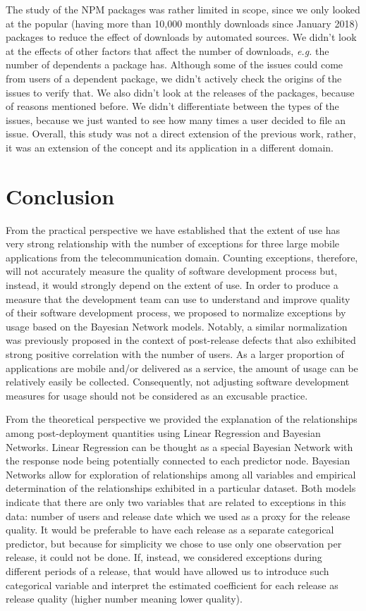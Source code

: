 \documentclass[smallextended]{svjour3}       %
\begin{document}
The study of the NPM packages was rather limited in scope, since we
only looked at the popular (having more than 10,000 monthly downloads 
since January 2018) packages to reduce the effect of downloads by 
automated sources. We didn't look at the effects of other factors 
that affect the number of downloads, \emph{e.g.} the number of 
dependents a package has. Although some of the issues could come 
from users of a dependent package, we didn't actively check the
origins of the issues to verify that. We also didn't look at the
releases of the packages, because of reasons mentioned before.
We didn't differentiate between the types of the issues, because we 
just wanted to see how many times a user decided to file an issue.
Overall, this study was not a direct extension of the previous work,
rather, it was an extension of the concept and its application in a different domain.



\section{Conclusion}\label{s:conclusion}

From the practical perspective we have established
that the extent of use has very strong relationship with the number
of exceptions for three large mobile applications from 
the telecommunication domain. Counting exceptions,
therefore, will not accurately measure the quality of software
development process but, instead, it would strongly depend on the
extent of use. In order to produce a measure that the development
team can use to understand and improve quality of their software
development process, we proposed to normalize exceptions by usage
based on the Bayesian Network models. Notably, a similar
normalization was previously proposed in the context of post-release
defects that also exhibited strong positive correlation with the
number of users.  As a larger proportion of applications are mobile
and/or delivered as a service, the amount of usage can be relatively
easily be collected.  Consequently, not adjusting software
development measures for usage should not be considered as an
excusable practice.

From the theoretical perspective we provided the explanation of the
relationships among post-deployment quantities using Linear
Regression and Bayesian Networks. Linear Regression can be thought
as a special Bayesian Network with the response node being
potentially connected to each predictor node. Bayesian Networks
allow for exploration of relationships among all variables and
empirical determination of the relationships exhibited in a
particular dataset.  Both models indicate that there are only two
variables that are related to exceptions in this data: number of
users and release date which we used as a proxy for the release
quality. It would be preferable to have each release as a separate
categorical predictor, but because for simplicity we chose to use
only one observation per release, it could not be done. If, instead,
we considered exceptions during different periods of a release, that
would have allowed us to introduce such categorical variable and
interpret the estimated coefficient for each release as release
quality (higher number meaning lower quality).
\end{document}
